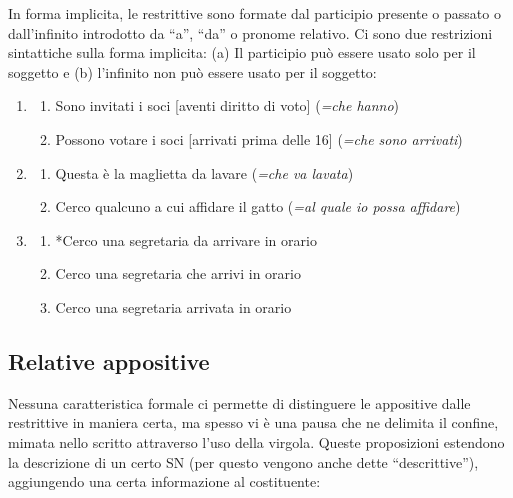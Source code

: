 \documentclass[
  a4paper,
  twoside,
  11pt,
  chapterprefix=false,
  bibliography=totocnumbered,
  listof=flat]{scrbook}
\providecommand{\tightlist}{%
  \setlength{\itemsep}{0pt}\setlength{\parskip}{0pt}}
\begin{document}
In forma implicita, le restrittive sono formate dal participio presente o passato o dall'infinito introdotto da \enquote{a}, \enquote{da} o pronome relativo. Ci sono due restrizioni sintattiche sulla forma implicita: (a) Il participio può essere usato solo per il soggetto e (b) l'infinito non può essere usato per il soggetto:

\begin{enumerate}
\def\labelenumi{(\arabic{enumi})}
\setcounter{enumi}{135}
\item
  \begin{enumerate}
  \def\labelenumii{\alph{enumii}.}
  \tightlist
  \item
    Sono invitati i soci {[}aventi diritto di voto{]} (\emph{=che hanno})
  \item
    Possono votare i soci {[}arrivati prima delle 16{]} (\emph{=che sono arrivati})
  \end{enumerate}
\item
  \begin{enumerate}
  \def\labelenumii{\alph{enumii}.}
  \tightlist
  \item
    Questa è la maglietta da lavare (\emph{=che va lavata})
  \item
    Cerco qualcuno a cui affidare il gatto (\emph{=al quale io possa affidare})
  \end{enumerate}
\item
  \begin{enumerate}
  \def\labelenumii{\alph{enumii}.}
  \tightlist
  \item
    *Cerco una segretaria da arrivare in orario
  \item
    Cerco una segretaria che arrivi in orario
  \item
    Cerco una segretaria arrivata in orario
  \end{enumerate}
\end{enumerate}

\hypertarget{relative-appositive}{%
\subsection{Relative appositive}\label{relative-appositive}}

Nessuna caratteristica formale ci permette di distinguere le appositive dalle restrittive in maniera certa, ma spesso vi è una pausa che ne delimita il confine, mimata nello scritto attraverso l'uso della virgola.
Queste proposizioni estendono la descrizione di un certo SN (per questo vengono anche dette \enquote{descrittive}), aggiungendo una certa informazione al costituente:
\end{document}

